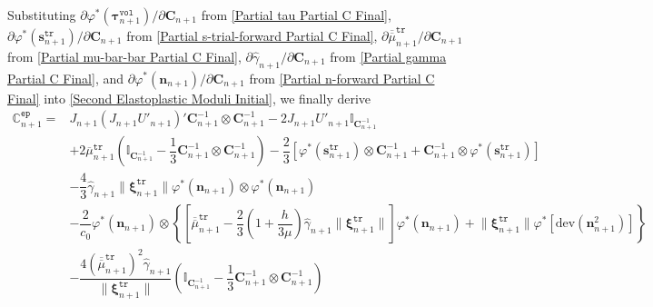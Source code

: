 \documentclass[preprint,11pt]{elsarticle}
\theoremstyle{definition}
\begin{document}
Substituting $\partial \varphi^*(\boldsymbol{\tau}_{n+1}^\texttt{vol}) / \partial \mathbf{C}_{n+1}$ from \eqref{Partial tau Partial C Final}, $\partial \varphi^*(\mathbf{s}_{n+1}^\texttt{tr}) / \partial \mathbf{C}_{n+1}$ from \eqref{Partial s-trial-forward Partial C Final}, $\partial \overline{\overline{\mu}}_{n+1}^\texttt{tr} / \partial \mathbf{C}_{n+1}$ from \eqref{Partial mu-bar-bar Partial C Final}, $\partial \widehat{\gamma}_{n+1} / \partial \mathbf{C}_{n+1}$ from \eqref{Partial gamma Partial C Final}, and $\partial \varphi^*(\mathbf{n}_{n+1}) / \partial \mathbf{C}_{n+1}$ from \eqref{Partial n-forward Partial C Final} into \eqref{Second Elastoplastic Moduli Initial}, we finally derive
\begin{equation*}
    \begin{array}{ll}
        \mathbb{C}_{n+1}^\texttt{ep} = &J_{n+1} (J_{n+1} U'_{n+1})' \mathbf{C}_{n+1}^{-1} \otimes \mathbf{C}_{n+1}^{-1}
        - 2 J_{n+1} U'_{n+1} \mathbb{I}_{\mathbf{C}_{n+1}^{-1}} \\[12pt]
        
        &+ 2 \overline{\mu}_{n+1}^\texttt{tr} \left( \mathbb{I}_{\mathbf{C}_{n+1}^{-1}} - \dfrac{1}{3} \mathbf{C}_{n+1}^{-1} \otimes \mathbf{C}_{n+1}^{-1} \right)
        - \dfrac{2}{3} \left[ \varphi^* \left( \mathbf{s}_{n+1}^\texttt{tr} \right) \otimes \mathbf{C}_{n+1}^{-1}
        + \mathbf{C}_{n+1}^{-1} \otimes \varphi^* \left( \mathbf{s}_{n+1}^\texttt{tr} \right) \right] \\[12pt]

        &- \dfrac{4}{3} \widehat{\gamma}_{n+1} \lVert \boldsymbol{\xi}_{n+1}^\texttt{tr} \rVert \varphi^*(\mathbf{n}_{n+1}) \otimes \varphi^* (\mathbf{n}_{n+1}) \\[12pt]

        &- \dfrac{2}{c_0} \varphi^* (\mathbf{n}_{n+1}) \otimes
        \left\{ \left[ \overline{\overline{\mu}}_{n+1}^\texttt{tr} - \dfrac{2}{3} \left( 1 + \dfrac{h}{3\mu} \right) \widehat{\gamma}_{n+1} \lVert \boldsymbol{\xi}_{n+1}^\texttt{tr} \rVert \right] \varphi^* (\mathbf{n}_{n+1})
        + \lVert \boldsymbol{\xi}_{n+1}^\texttt{tr} \rVert \varphi^*\left[ \text{dev} (\mathbf{n}_{n+1}^2) \right] \right\} \\[12pt]

        &- \dfrac{4 \left( \overline{\overline{\mu}}_{n+1}^\texttt{tr} \right)^2 \widehat{\gamma}_{n+1}}{\lVert \boldsymbol{\xi}_{n+1}^\texttt{tr} \rVert}
        \left( \mathbb{I}_{\mathbf{C}_{n+1}^{-1}} - \dfrac{1}{3} \mathbf{C}_{n+1}^{-1} \otimes \mathbf{C}_{n+1}^{-1} \right) \\[12pt] 
        

\end{array}
\end{equation*}
\end{document}
